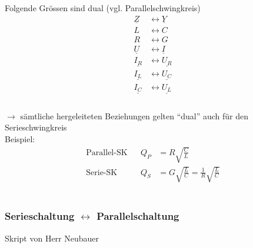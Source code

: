 Folgende Grössen sind dual (vgl. Parallelschwingkreis)\\
\begin{align}
\underline{Z} &\leftrightarrow \underline{Y}\nonumber\\
L &\leftrightarrow C\nonumber\\
R &\leftrightarrow G\nonumber\\
\underline{U} &\leftrightarrow \underline{I}\nonumber\\
\underline{I_R} &\leftrightarrow \underline{U_R}\nonumber\\
\underline{I_L} &\leftrightarrow \underline{U_C}\nonumber\\
\underline{I_C} &\leftrightarrow \underline{U_L}\nonumber\\
\end{align}\\


$\rightarrow$ sämtliche hergeleiteten Beziehungen gelten "`dual"' auch für den
Serieschwingkreis\\
Beispiel: 
\begin{align}
\text{Parallel-SK} && Q_P&=R\sqrt{\frac{C}{L}}\nonumber\\
\text{Serie-SK} &&
Q_S&=G\sqrt{\frac{L}{C}}=\frac{1}{R}\sqrt{\frac{L}{C}}\nonumber
\end{align}\\

\subsubsection{Serieschaltung $\leftrightarrow$ Parallelschaltung}
Skript von Herr Neubauer